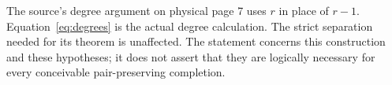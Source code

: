 The source's degree argument on physical page 7 uses $r$ in place of $r-1$.
Equation~\eqref{eq:degrees} is the actual degree calculation. The strict
separation needed for its theorem is unaffected. The statement concerns this
construction and these hypotheses; it does not assert that they are logically
necessary for every conceivable pair-preserving completion.
